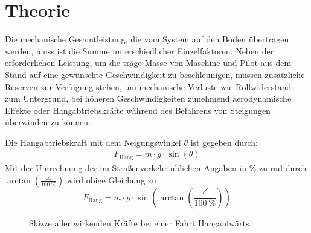 \chapter{Theorie}
	Die mechanische Gesamtleistung, die vom System auf den Boden übertragen werden, muss ist die Summe unterschiedlicher Einzelfaktoren.
	Neben der erforderlichen Leistung, um die träge Masse von Maschine und Pilot aus dem Stand auf eine gewünschte Geschwindigkeit zu beschleunigen, müssen zusätzliche Reserven zur Verfügung stehen, um mechanische Verluste wie Rollwiderstand zum Untergrund, bei höheren Geschwindigkeiten zunehmend aerodynamische Effekte oder Hangabtriebskräfte während des Befahrens von Steigungen überwinden zu können.\par\medskip
	Die Hangabtriebskraft mit dem Neigungswinkel \(\theta\) ist gegeben durch:
	\begin{align}
		F_\text{Hang} = m \cdot g \cdot \sin\left(\theta\right)
		\label{eq:downhill force}
	\end{align}
	Mit der Umrechnung der im Straßenverkehr üblichen Angaben in \unit{\percent} zu \unit{\radian} durch \(\arctan\left(\frac{\angle}{\qty{100}{\percent}}\right)\) wird obige Gleichung zu
	\begin{equation}
		F_\text{Hang} = m \cdot g \cdot \sin\left(\arctan\left(\frac{\angle}{\qty{100}{\percent}}\right)\right)
		\label{eq:downhill force incline to radian}
	\end{equation}
	\begin{figure}[h]
		\centering
		
		\caption[Skizze aller wirkenden Kräfte bei einer Fahrt Hangaufwärts]{Skizze aller wirkenden Kräfte bei einer Fahrt Hangaufwärts.}%
		\label{fig:sketch torque incline}
	\end{figure}

